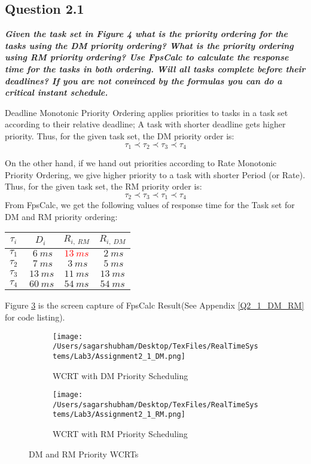 \documentclass[oneside,a4paper]{article}
\begin{document}
\subsection*{\normalsize{Question 2.1}}
\textit{\textbf{Given the task set in Figure 4 what is the priority ordering for the tasks using the DM priority ordering? What is the priority ordering using RM priority ordering? Use FpsCalc to calculate the response time for the tasks in both ordering. Will all tasks complete before their deadlines? If you are not convinced by the formulas you can do a critical instant schedule.
}}\par
Deadline Monotonic Priority Ordering applies priorities to tasks in a task set according to their relative deadline; A task with shorter deadline gets higher priority. Thus, for the given task set, the DM priority order is:
$$ \tau_1 \prec \tau_2 \prec \tau_3 \prec \tau_4 $$\par
On the other hand, if we hand out priorities according to Rate Monotonic Priority Ordering, we give higher priority to a task with shorter Period (or Rate). Thus, for the given task set, the RM priority order is:
$$ \tau_2 \prec \tau_3 \prec \tau_1 \prec \tau_4  $$
From FpsCalc, we get the following values of response time for the Task set for DM and RM priority ordering: \par
\begin{center}
\begin{tabular}{| c | c | c | c |}
\hline
\textbf{$\tau_i$} & \textbf{$D_i$} &     \textbf{$R_{i,\ RM}$} & \textbf{$R_{i,\ DM}$}\\
\hline
$\tau_1$ &  $\ \ 6\ ms$ & \textcolor{red}{$13 \ ms$} & $\ 2 \ ms$ \\
$\tau_2$ &  $\ \ 7\ ms$ & $\ 3 \ ms$ & $\ 5 \ ms$ \\
$\tau_3$ &  $\ 13\ ms$ & $11 \ ms$ & $13 \ ms$ \\
$\tau_4$ &  $\ 60\ ms$ & $54 \ ms$ & $54 \ ms$ \\
\hline
\end{tabular}
\end{center}\par
\pagebreak
Figure \ref{figure7} is the screen capture of FpsCalc Result(See Appendix \ref{Q2_1_DM_RM} for code listing).\par 
\begin{figure}
\centering
\begin{subfigure}{.525\textwidth}
  \centering
  \texttt{[image: /Users/sagarshubham/Desktop/TexFiles/RealTimeSystems/Lab3/Assignment2\_1\_DM.png]}
  \caption{WCRT with DM Priority Scheduling}
  \label{figure2_1_DM}
\end{subfigure}%
\begin{subfigure}{.525\textwidth}
  \centering
  \texttt{[image: /Users/sagarshubham/Desktop/TexFiles/RealTimeSystems/Lab3/Assignment2\_1\_RM.png]}
  \caption{WCRT with RM Priority Scheduling}
  \label{figure2_1_RM}
\end{subfigure}
\caption[Figure for Question 2.1]{DM and RM Priority WCRTs}
\label{figure7}
\end{figure}
\end{document}

